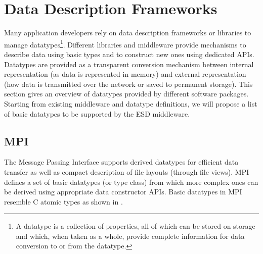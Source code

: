 \section{Data Description Frameworks}
\label{sec: data-formats}


Many application developers rely on data description frameworks or libraries to manage datatypes\footnote{A datatype is a collection of properties, all of which can be stored on storage and which, when taken as a whole, provide complete information for data conversion to or from the datatype.}.
Different libraries and middleware provide mechanisms to describe data using basic types and to construct new ones using dedicated APIs.
Datatypes are provided as a transparent conversion mechanism between internal representation (as data is represented in memory) and external representation (how data is transmitted over the network or saved to permanent storage).
This section gives an overview of datatypes provided by different software packages.
Starting from existing middleware and datatype definitions, we will propose a list of basic datatypes to be supported by the ESD middleware.


\subsection{MPI}
The Message Passing Interface supports derived datatypes for efficient data transfer as well as compact description of file layouts (through file views). MPI defines a set of basic datatypes (or type class) from which more complex ones can be derived using appropriate data constructor APIs. Basic datatypes in MPI resemble C atomic types as shown in .

\clearpage

